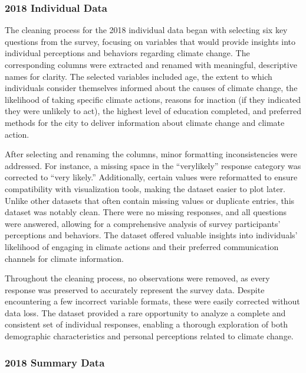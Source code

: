 \documentclass[
  letterpaper,
  DIV=11,
  numbers=noendperiod]{scrartcl}
\begin{document}
\subsubsection{2018 Individual Data}\label{individual-data}

The cleaning process for the 2018 individual data began with selecting
six key questions from the survey, focusing on variables that would
provide insights into individual perceptions and behaviors regarding
climate change. The corresponding columns were extracted and renamed
with meaningful, descriptive names for clarity. The selected variables
included age, the extent to which individuals consider themselves
informed about the causes of climate change, the likelihood of taking
specific climate actions, reasons for inaction (if they indicated they
were unlikely to act), the highest level of education completed, and
preferred methods for the city to deliver information about climate
change and climate action.

After selecting and renaming the columns, minor formatting
inconsistencies were addressed. For instance, a missing space in the
``verylikely'' response category was corrected to ``very likely.''
Additionally, certain values were reformatted to ensure compatibility
with visualization tools, making the dataset easier to plot later.
Unlike other datasets that often contain missing values or duplicate
entries, this dataset was notably clean. There were no missing
responses, and all questions were answered, allowing for a comprehensive
analysis of survey participants' perceptions and behaviors. The dataset
offered valuable insights into individuals' likelihood of engaging in
climate actions and their preferred communication channels for climate
information.

Throughout the cleaning process, no observations were removed, as every
response was preserved to accurately represent the survey data. Despite
encountering a few incorrect variable formats, these were easily
corrected without data loss. The dataset provided a rare opportunity to
analyze a complete and consistent set of individual responses, enabling
a thorough exploration of both demographic characteristics and personal
perceptions related to climate change.\\

\subsubsection{2018 Summary Data}\label{summary-data}
\end{document}
